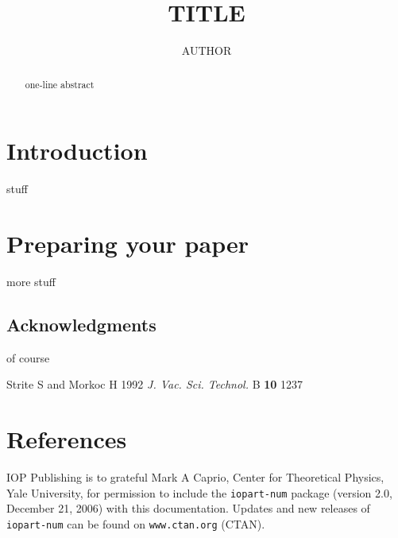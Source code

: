 \documentclass[a4paper]{jpconf}
\begin{document}
\title{TITLE}

\author{AUTHOR}

\address{Production Editor, \jpcs, \iopp, Dirac House, Temple Back, Bristol BS1~6BE, UK}


\begin{abstract}
one-line abstract
\end{abstract}

\section{Introduction}

stuff

\section{Preparing your paper}

more stuff

\subsection{Acknowledgments}

of course

\medskip
\begin{thebibliography}{9}
\item Strite S and Morkoc H 1992 {\it J. Vac. Sci. Technol.} B {\bf 10} 1237 
\end{thebibliography}
\smallskip

\section*{References}
\begin{thebibliography}{9}
 IOP Publishing is to grateful Mark A Caprio, Center for Theoretical Physics, Yale University, for permission to include the {\tt iopart-num} \BibTeX package (version 2.0, December 21, 2006) with  this documentation. Updates and new releases of {\tt iopart-num} can be found on \verb"www.ctan.org" (CTAN). 
\end{thebibliography}
\end{document}
